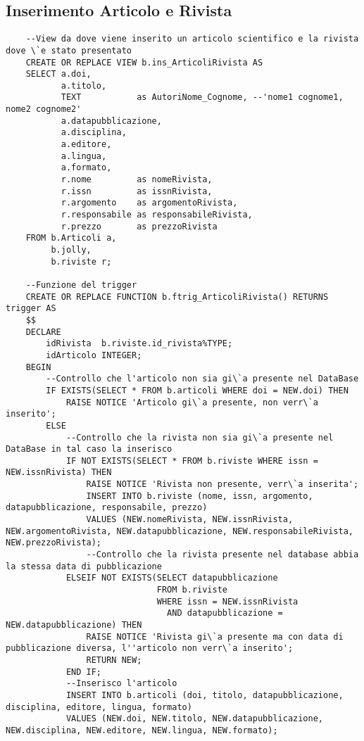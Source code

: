 \subsection{Inserimento Articolo e Rivista}
\begin{lstlisting}
    --View da dove viene inserito un articolo scientifico e la rivista dove \`e stato presentato
    CREATE OR REPLACE VIEW b.ins_ArticoliRivista AS
    SELECT a.doi,
           a.titolo,
           TEXT           as AutoriNome_Cognome, --'nome1 cognome1, nome2 cognome2'
           a.datapubblicazione,
           a.disciplina,
           a.editore,
           a.lingua,
           a.formato,
           r.nome         as nomeRivista,
           r.issn         as issnRivista,
           r.argomento    as argomentoRivista,
           r.responsabile as responsabileRivista,
           r.prezzo       as prezzoRivista
    FROM b.Articoli a,
         b.jolly,
         b.riviste r;
    
    --Funzione del trigger
    CREATE OR REPLACE FUNCTION b.ftrig_ArticoliRivista() RETURNS trigger AS
    $$
    DECLARE
        idRivista  b.riviste.id_rivista%TYPE;
        idArticolo INTEGER;
    BEGIN
        --Controllo che l'articolo non sia gi\`a presente nel DataBase
        IF EXISTS(SELECT * FROM b.articoli WHERE doi = NEW.doi) THEN
            RAISE NOTICE 'Articolo gi\`a presente, non verr\`a inserito';
        ELSE
            --Controllo che la rivista non sia gi\`a presente nel DataBase in tal caso la inserisco
            IF NOT EXISTS(SELECT * FROM b.riviste WHERE issn = NEW.issnRivista) THEN
                RAISE NOTICE 'Rivista non presente, verr\`a inserita';
                INSERT INTO b.riviste (nome, issn, argomento, datapubblicazione, responsabile, prezzo)
                VALUES (NEW.nomeRivista, NEW.issnRivista, NEW.argomentoRivista, NEW.datapubblicazione, NEW.responsabileRivista, NEW.prezzoRivista);
                --Controllo che la rivista presente nel database abbia la stessa data di pubblicazione
            ELSEIF NOT EXISTS(SELECT datapubblicazione
                              FROM b.riviste
                              WHERE issn = NEW.issnRivista
                                AND datapubblicazione = NEW.datapubblicazione) THEN
                RAISE NOTICE 'Rivista gi\`a presente ma con data di pubblicazione diversa, l''articolo non verr\`a inserito';
                RETURN NEW;
            END IF;
            --Inserisco l'articolo
            INSERT INTO b.articoli (doi, titolo, datapubblicazione, disciplina, editore, lingua, formato)
            VALUES (NEW.doi, NEW.titolo, NEW.datapubblicazione, NEW.disciplina, NEW.editore, NEW.lingua, NEW.formato);
    

\end{lstlisting}
